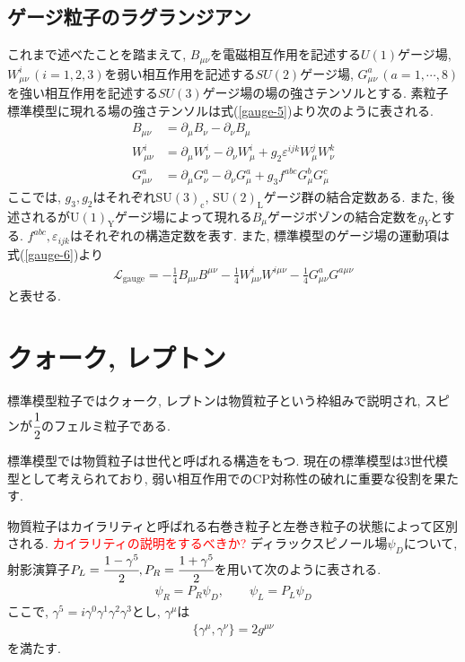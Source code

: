 \subsection{ゲージ粒子のラグランジアン}
これまで述べたことを踏まえて, $B_{\mu\nu}$を電磁相互作用を記述する$U(1)$ゲージ場, $W_{\mu\nu}^i\,(i=1,2,3)$を弱い相互作用を記述する$SU(2)$ゲージ場, $G_{\mu\nu}^a\,(a=1,\cdots,8)$を強い相互作用を記述する$SU(3)$ゲージ場の場の強さテンソルとする.
素粒子標準模型に現れる場の強さテンソルは式(\ref{gauge-5})より次のように表される.
\begin{align}
  B_{\mu\nu} &= \partial_\mu B_\nu - \partial_\nu B_\mu \label{gauge.B}\\
  W_{\mu\nu}^i &= \partial_\mu W_\nu^i - \partial_\nu W_\mu^i+g_2\varepsilon^{ijk}W_\mu^j W_\nu^k \label{gauge.W}\\
  G_{\mu\nu}^a &= \partial_\mu G_\nu^a - \partial_\nu G_\mu^a +g_3 f^{abc}G_\mu^b G_\mu^c\label{gauge.G}
\end{align}
ここでは, $g_3, g_2$はそれぞれ$\mathrm{SU}(3)_\mathrm{c}$, $\mathrm{SU}(2)_\mathrm{L}$ゲージ群の結合定数ある.
また, 後述されるが$\mathrm{U(1)}_{\mathrm {Y}}$ゲージ場によって現れる$B_\mu$ゲージボゾンの結合定数を$g_Y$とする.
$f^{abc}, \varepsilon_{ijk} $はそれぞれの構造定数を表す.
また, 標準模型のゲージ場の運動項は式(\ref{gauge-6})より
\begin{align}
  \mathcal{L}_{\text{gauge}} = -\frac{1}{4}B_{\mu\nu} B^{\mu\nu} - \frac{1}{4}W_{\mu\nu}^i W^{i\mu\nu} -\frac{1}{4}G_{\mu\nu}^a G^{a\mu\nu}\label{gauge.kin}
\end{align}
と表せる.
\section{クォーク, レプトン}
標準模型粒子ではクォーク, レプトンは物質粒子という枠組みで説明され, スピンが$\cfrac{1}{2}$のフェルミ粒子である.

標準模型では物質粒子は世代と呼ばれる構造をもつ.
現在の標準模型は3世代模型として考えられており, 弱い相互作用でのCP対称性の破れに重要な役割を果たす.\cite{cabibbo_unitary_1963,kobayashi_cp-violation_1973}

物質粒子はカイラリティと呼ばれる右巻き粒子と左巻き粒子の状態によって区別される.
\textcolor{red}{カイラリティの説明をするべきか?}
ディラックスピノール場$\psi_D$について, 射影演算子$P_L = \cfrac{1-\gamma^5}{2}, P_R= \cfrac{1+\gamma^5}{2}$を用いて次のように表される.
\begin{align}
  \psi_R = P_R \psi_D,\qquad \psi_L=P_L \psi_D
\end{align}
ここで, $\gamma^5= i\gamma^0 \gamma^1 \gamma^2 \gamma^3$とし, $\gamma^\mu$は
\begin{align}
  \{ \gamma^\mu, \gamma^\nu \} = 2g^{\mu\nu}
\end{align}
を満たす.

